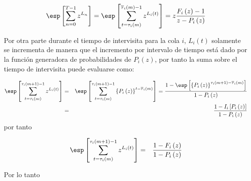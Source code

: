 \begin{eqnarray}\label{Eq.Arribos.Primera}
\esp\left[\sum_{n=0}^{T-1}z^{L_{n}}\right]=
\esp\left[\sum_{t=\tau_{i}\left(m\right)}^{\overline{\tau}_{i}\left(m\right)-1}z^{L_{i}\left(t\right)}\right]
=z\frac{F_{i}\left(z\right)-1}{z-P_{i}\left(z\right)}
\end{eqnarray}

Por otra parte durante el tiempo de intervisita para la cola $i$, $L_{i}\left(t\right)$ solamente se incrementa de manera que el incremento por intervalo de tiempo est\'a dado por la funci\'on generadora de probabilidades de $P_{i}\left(z\right)$, por tanto la suma sobre el tiempo de intervisita puede evaluarse como:

\begin{eqnarray*}
\esp\left[\sum_{t=\tau_{i}\left(m\right)}^{\tau_{i}\left(m+1\right)-1}z^{L_{i}\left(t\right)}\right]&=&\esp\left[\sum_{t=\tau_{i}\left(m\right)}^{\tau_{i}\left(m+1\right)-1}\left\{P_{i}\left(z\right)\right\}^{t-\overline{\tau}_{i}\left(m\right)}\right]=\frac{1-\esp\left[\left\{P_{i}\left(z\right)\right\}^{\tau_{i}\left(m+1\right)-\overline{\tau}_{i}\left(m\right)}\right]}{1-P_{i}\left(z\right)}\\
&=&\frac{1-I_{i}\left[P_{i}\left(z\right)\right]}{1-P_{i}\left(z\right)}
\end{eqnarray*}
por tanto

\begin{eqnarray*}
\esp\left[\sum_{t=\tau_{i}\left(m\right)}^{\tau_{i}\left(m+1\right)-1}z^{L_{i}\left(t\right)}\right]&=&
\frac{1-F_{i}\left(z\right)}{1-P_{i}\left(z\right)}
\end{eqnarray*}

Por lo tanto

